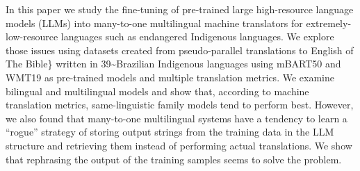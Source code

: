 In this paper we study the fine-tuning of pre-trained large high-resource language models (LLMs) into many-to-one multilingual machine translators for extremely-low-resource languages such as endangered Indigenous languages. We explore those issues using datasets created from pseudo-parallel translations to English of The Bible\} written in 39\textasciitilde{}Brazilian Indigenous languages using mBART50 and WMT19 as pre-trained models and multiple translation metrics. We examine bilingual and multilingual models and show that, according to machine translation metrics, same-linguistic family models tend to perform best. However, we also found that many-to-one multilingual systems have a tendency to learn a “rogue” strategy of storing output strings from the training data in the LLM structure and retrieving them instead of performing actual translations. We show that rephrasing the output of the training samples seems to solve the problem.